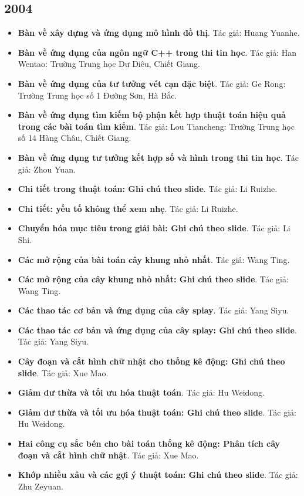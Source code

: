 \documentclass[11pt]{article}
\begin{document}
\subsection{2004}
\begin{itemize}[leftmargin=2em]
  \item \textbf{Bàn về xây dựng và ứng dụng mô hình đồ thị}. Tác giả: Huang Yuanhe.
  \item \textbf{Bàn về ứng dụng của ngôn ngữ C++ trong thi tin học}. Tác giả: Han Wentao: Trường Trung học Dư Diêu, Chiết Giang.
  \item \textbf{Bàn về ứng dụng của tư tưởng vét cạn đặc biệt}. Tác giả: Ge Rong: Trường Trung học số 1 Đường Sơn, Hà Bắc.
  \item \textbf{Bàn về ứng dụng tìm kiếm bộ phận kết hợp thuật toán hiệu quả trong các bài toán tìm kiếm}. Tác giả: Lou Tiancheng: Trường Trung học số 14 Hàng Châu, Chiết Giang.
  \item \textbf{Bàn về ứng dụng tư tưởng kết hợp số và hình trong thi tin học}. Tác giả: Zhou Yuan.
  \item \textbf{Chi tiết trong thuật toán: Ghi chú theo slide}. Tác giả: Li Ruizhe.
  \item \textbf{Chi tiết: yếu tố không thể xem nhẹ}. Tác giả: Li Ruizhe.
  \item \textbf{Chuyển hóa mục tiêu trong giải bài: Ghi chú theo slide}. Tác giả: Li Shi.
  \item \textbf{Các mở rộng của bài toán cây khung nhỏ nhất}. Tác giả: Wang Ting.
  \item \textbf{Các mở rộng của cây khung nhỏ nhất: Ghi chú theo slide}. Tác giả: Wang Ting.
  \item \textbf{Các thao tác cơ bản và ứng dụng của cây splay}. Tác giả: Yang Siyu.
  \item \textbf{Các thao tác cơ bản và ứng dụng của cây splay: Ghi chú theo slide}. Tác giả: Yang Siyu.
  \item \textbf{Cây đoạn và cắt hình chữ nhật cho thống kê động: Ghi chú theo slide}. Tác giả: Xue Mao.
  \item \textbf{Giảm dư thừa và tối ưu hóa thuật toán}. Tác giả: Hu Weidong.
  \item \textbf{Giảm dư thừa và tối ưu hóa thuật toán: Ghi chú theo slide}. Tác giả: Hu Weidong.
  \item \textbf{Hai công cụ sắc bén cho bài toán thống kê động: Phân tích cây đoạn và cắt hình chữ nhật}. Tác giả: Xue Mao.
  \item \textbf{Khớp nhiều xâu và các gợi ý thuật toán: Ghi chú theo slide}. Tác giả: Zhu Zeyuan.

\end{itemize}
\end{document}
